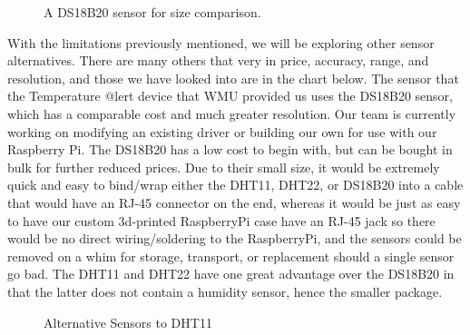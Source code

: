 \documentclass{report}
\begin{document}
\begin{itemize}
\begin{figure}[H]
\caption{A DS18B20 sensor for size comparison.}
\end{figure}


With the limitations previously mentioned, we will be exploring other sensor alternatives. There are many others that very in price, accuracy, range, and resolution, and those we have looked into are in the chart below. The sensor that the Temperature @lert device that WMU provided us uses the DS18B20 sensor, which has a comparable cost and much greater resolution. Our team is currently working on modifying an existing driver or building our own for use with our Raspberry Pi. The DS18B20 has a low cost to begin with, but can be bought in bulk for further reduced prices.  Due to their small size, it would be extremely quick and easy to bind/wrap either the DHT11, DHT22, or DS18B20 into a cable that would have an RJ-45 connector on the end, whereas it would be just as easy to have our custom 3d-printed RaspberryPi case have an RJ-45 jack so there would be no direct wiring/soldering to the RaspberryPi, and the sensors could be removed on a whim for storage, transport, or replacement should a single sensor go bad. The DHT11 and DHT22 have one great advantage over the DS18B20 in that the latter does not contain a humidity sensor, hence the smaller package.

\begin{figure}[H]
\caption{Alternative Sensors to DHT11}
\end{figure}




\end{itemize}
\end{document}
